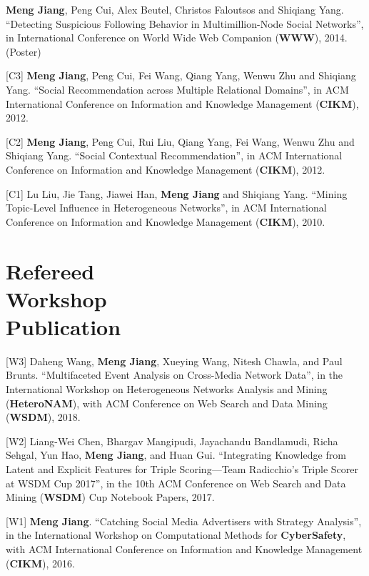 \documentclass[margin, 9pt]{res}
\begin{document}
\begin{resume}
[C4] \textbf{Meng Jiang}, Peng Cui, Alex Beutel, Christos Faloutsos and Shiqiang Yang. ``Detecting Suspicious Following Behavior in Multimillion-Node Social Networks'', in International Conference on World Wide Web Companion (\textbf{WWW}), 2014. (Poster)

[C3] \textbf{Meng Jiang}, Peng Cui, Fei Wang, Qiang Yang, Wenwu Zhu and Shiqiang Yang. ``Social Recommendation across Multiple Relational Domains'', in ACM International Conference on Information and Knowledge Management (\textbf{CIKM}), 2012.

[C2] \textbf{Meng Jiang}, Peng Cui, Rui Liu, Qiang Yang, Fei Wang, Wenwu Zhu and Shiqiang Yang. ``Social Contextual Recommendation'', in ACM International Conference on Information and Knowledge Management (\textbf{CIKM}), 2012.

[C1] Lu Liu, Jie Tang, Jiawei Han, \textbf{Meng Jiang} and Shiqiang Yang. ``Mining Topic-Level Influence in Heterogeneous Networks'', in ACM International Conference on Information and Knowledge Management (\textbf{CIKM}), 2010.


\section{Refereed \\ Workshop \\ Publication}

[W3] Daheng Wang, \textbf{Meng Jiang}, Xueying Wang, Nitesh Chawla, and Paul Brunts. ``Multifaceted Event Analysis on Cross-Media Network Data'', in the International Workshop on Heterogeneous Networks Analysis and Mining (\textbf{HeteroNAM}), with ACM Conference on Web Search and Data Mining (\textbf{WSDM}), 2018.

[W2] Liang-Wei Chen, Bhargav Mangipudi, Jayachandu Bandlamudi, Richa Sehgal, Yun Hao, \textbf{Meng Jiang}, and Huan Gui. ``Integrating Knowledge from Latent and Explicit Features for Triple Scoring—Team Radicchio's Triple Scorer at WSDM Cup 2017'', in the 10th ACM Conference on Web Search and Data Mining (\textbf{WSDM}) Cup Notebook Papers, 2017.

[W1] \textbf{Meng Jiang}. ``Catching Social Media Advertisers with Strategy Analysis'', in the International Workshop on Computational Methods for \textbf{CyberSafety}, with ACM International Conference on Information and Knowledge Management (\textbf{CIKM}), 2016.


\end{resume}
\end{document}
